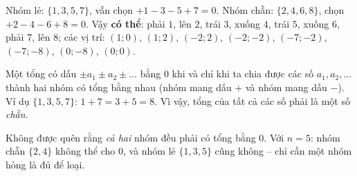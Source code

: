 {
Nhóm lẻ: $\{1,3,5,7\}$, vẫn chọn $+1-3-5+7=0$. Nhóm chẵn: $\{2,4,6,8\}$, chọn $+2-4-6+8=0$. Vậy \textbf{có thể}: phải $1$, lên $2$, trái $3$, xuống $4$, trái $5$, xuống $6$, phải $7$, lên $8$; các vị trí: $(1;0)$, $(1;2)$, $(-2;2)$, $(-2;-2)$, $(-7;-2)$, $(-7;-8)$, $(0;-8)$, $(0;0)$.
\begin{proofbox}Một tổng có dấu $\pm a_1\pm a_2\pm\dots$ bằng $0$ khi và chỉ khi ta chia được các số $a_1,a_2,\dots$ thành hai nhóm có tổng bằng nhau (nhóm mang dấu $+$ và nhóm mang dấu $-$). Ví dụ $\{1,3,5,7\}$: $1+7=3+5=8$. Vì vậy, tổng của tất cả các số phải là một số \emph{chẵn}.\end{proofbox}
\begin{warnbox}Không được quên rằng \emph{cả hai} nhóm đều phải có tổng bằng $0$. Với $n=5$: nhóm chẵn $\{2,4\}$ không thể cho $0$, và nhóm lẻ $\{1,3,5\}$ cũng không -- chỉ cần một nhóm hỏng là đủ để loại.\end{warnbox}
}

